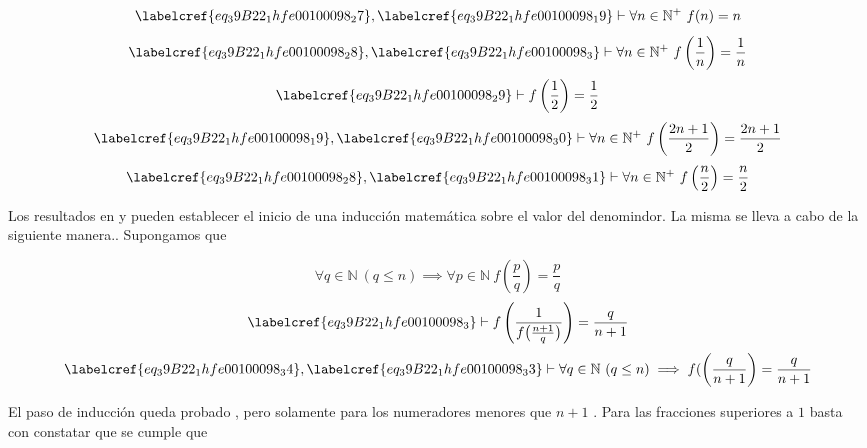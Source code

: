 \begin{equation} \label{eq_39B22_1hfe00100098_28}
	\labelcref{eq_39B22_1hfe00100098_27}, \labelcref{eq_39B22_1hfe00100098_19} \vdash \forall n \in \mathbb{N}^{+}\ f(n) = n
\end{equation}
\begin{equation} \label{eq_39B22_1hfe00100098_29}
	\labelcref{eq_39B22_1hfe00100098_28}, \labelcref{eq_39B22_1hfe00100098_3} \vdash \forall n \in \mathbb{N}^{+}\ f\left(\frac{1}{n}\right) = \frac{1}{n}
\end{equation}
\begin{equation} \label{eq_39B22_1hfe00100098_30}
	\labelcref{eq_39B22_1hfe00100098_29} \vdash f\left(\frac{1}{2}\right) = \frac{1}{2}
\end{equation}
\begin{equation} \label{eq_39B22_1hfe00100098_31}
	\labelcref{eq_39B22_1hfe00100098_19}, \labelcref{eq_39B22_1hfe00100098_30} \vdash \forall n \in \mathbb{N}^{+}\ f\left(\frac{2n+1}{2}\right) = \frac{2n+1}{2}
\end{equation}
\begin{equation} \label{eq_39B22_1hfe00100098_32}
	\labelcref{eq_39B22_1hfe00100098_28}, \labelcref{eq_39B22_1hfe00100098_31} \vdash \forall n \in \mathbb{N}^{+}\ f\left(\frac{n}{2}\right) = \frac{n}{2}
\end{equation}

Los resultados en  y  pueden establecer el inicio de una inducción matemática sobre el valor del denomindor. La misma se lleva a cabo de la siguiente manera.. Supongamos que 

\begin{equation} \label{eq_39B22_1hfe00100098_33}
	\forall q \in \mathbb{N}\ (q \leq n) \implies \forall p \in \mathbb{N}\ f\left(\frac{p}{q}\right) = \frac{p}{q}
\end{equation}
\begin{equation} \label{eq_39B22_1hfe00100098_34}
	\labelcref{eq_39B22_1hfe00100098_3} \vdash f\left(\frac{1}{f\big(\frac{n+1}{q}\big)}\right) = \frac{q}{n+1}
\end{equation}
\begin{equation} \label{eq_39B22_1hfe00100098_35}
	\labelcref{eq_39B22_1hfe00100098_34} , \labelcref{eq_39B22_1hfe00100098_33} \vdash \forall q \in \mathbb{N}\ (q \leq n) \implies f(\left(\frac{q}{n+1}\right) = \frac{q}{n+1}
\end{equation}

El paso de inducción queda probado , pero solamente para los numeradores menores que $n+1$ . Para las fracciones superiores a $1$ basta con constatar que se cumple que

